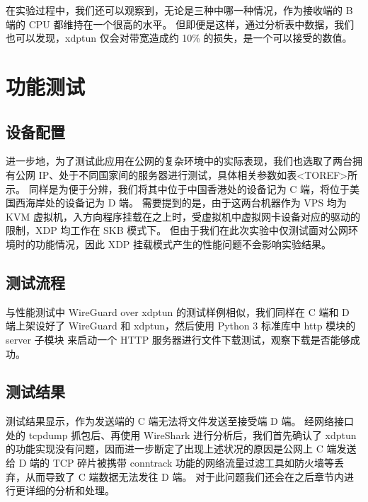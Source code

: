 在实验过程中，我们还可以观察到，无论是三种中哪一种情况，作为接收端的 B 端的 CPU 都维持在一个很高的水平。
但即便是这样，通过分析表中数据，我们也可以发现，xdptun 仅会对带宽造成约 10\% 的损失，是一个可以接受的数值。

\section{功能测试}

\subsection{设备配置}

进一步地，为了测试此应用在公网的复杂环境中的实际表现，我们也选取了两台拥有公网 IP、处于不同国家间的服务器进行测试，具体相关参数如表<TOREF>所示。
同样是为便于分辨，我们将其中位于中国香港处的设备记为 C 端，将位于美国西海岸处的设备记为 D 端。
需要提到的是，由于这两台机器作为 VPS 均为 KVM 虚拟机，入方向程序挂载在之上时，受虚拟机中虚拟网卡设备对应的驱动的限制，XDP 均工作在 SKB 模式下。
但由于我们在此次实验中仅测试面对公网环境时的功能情况，因此 XDP 挂载模式产生的性能问题不会影响实验结果。

\subsection{测试流程}

与性能测试中 WireGuard over xdptun 的测试样例相似，我们同样在 C 端和 D 端上架设好了 WireGuard 和 xdptun，然后使用 Python 3 标准库中 http 模块的 server 子模块 来启动一个 HTTP 服务器进行文件下载测试，观察下载是否能够成功。

\subsection{测试结果}

测试结果显示，作为发送端的 C 端无法将文件发送至接受端 D 端。
经网络接口处的 tcpdump 抓包后、再使用 WireShark 进行分析后，我们首先确认了 xdptun 的功能实现没有问题，因而进一步断定了出现上述状况的原因是公网上 C 端发送给 D 端的 TCP 碎片被携带 conntrack 功能的网络流量过滤工具如防火墙等丢弃，从而导致了 C 端数据无法发往 D 端。
对于此问题我们还会在之后章节内进行更详细的分析和处理。
